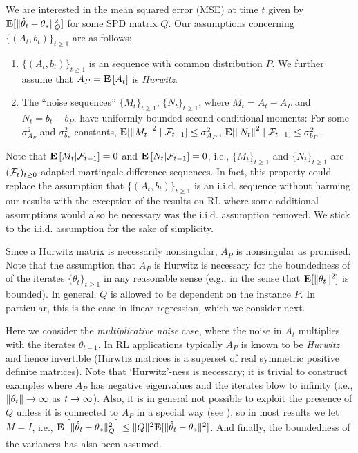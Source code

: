 We are interested in the mean squared error (MSE) at time $t$ given by $\mathbf{E}[\| \hat{\theta}_t-\theta_*\|^2_Q]$ 
for some SPD matrix $Q$. Our assumptions concerning $\{(A_t,b_t)\}_{t\ge 1}$ are as follows:
\begin{assumption}\label{assmp:lsa}
\begin{enumerate}[leftmargin=*, before = \leavevmode\vspace{-\baselineskip}]
\item \label{dist} $\{(A_t, b_t)\}_{t\ge 1}$ is an \iid sequence with common distribution $P$. 
We further assume that $A_P = \mathbf{E}\left[A_t\right]$ is \emph{Hurwitz}.  
\item \label{matvar}  
The ``noise sequences'' $\{M_t\}_{t\ge 1}$, $\{N_t\}_{t\ge 1}$,
where  $M_t= A_t-A_{P}$
 and $N_t= b_t-b_{P}$,
have uniformly bounded second conditional moments:
For some $\sigma^2_{A_P}$ and $\sigma^2_{b_P}$ constants,
$\mathbf{E}[\left\| M_t\right\|^2\mid\mathcal{F}_{t-1}]\leq \sigma^2_{A_P}$,
$\mathbf{E}[\left\| N_t\right\|^2\mid\mathcal{F}_{t-1}] \leq\sigma^2_{b_P}$.
\end{enumerate}
\end{assumption}
Note that $\mathbf{E}\left[M_t|\mathcal{F}_{t-1}\right]=0$ and $\mathbf{E}\left[N_t|\mathcal{F}_{t-1}\right]=0$, i.e., $\{M_t\}_{t\ge 1}$
and $\{N_t\}_{t\ge 1}$ are $(\mathcal{F}_t)_{t\ge 0}$-adapted martingale difference sequences. 
In fact, this property could replace
the assumption that $\{(A_t,b_t)\}_{t\ge 1}$ is an i.i.d. sequence without harming our results with the exception of the results on RL where some additional assumptions would also be necessary was the i.i.d. assumption removed. We stick to the i.i.d. assumption for the sake of simplicity.

Since a Hurwitz matrix is necessarily nonsingular, $A_P$ is nonsingular as promised.
Note that the assumption that $A_P$ is Hurwitz is necessary for the boundedness of
of the iterates $\{\theta_t\}_{t\ge 1}$ in any reasonable sense (e.g., in the sense that 
 $\mathbf{E}[\| \theta_t\|^2]$ is bounded).
 In general, $Q$ is allowed to be dependent on the instance $P$. In particular, 
 this is the case in linear regression, which we consider next.

Here we consider the \emph{multiplicative noise} case, where the noise in $A_t$ multiplies with the iterates $\theta_{t-1}$. In RL applications typically $A_P$ is known to be \emph{Hurwitz} and hence invertible (Hurwtiz matrices is a superset of real symmetric positive definite matrices). Note that `Hurwitz'-ness is necessary; it is trivial to construct examples where $A_P$ has negative eigenvalues and the iterates blow to infinity (i.e., $\left\| \theta_t\right\|\rightarrow\infty$ as $t\rightarrow\infty$). Also, it is in general not possible to exploit the presence of $Q$ unless it is connected to $A_P$ in a special way (see ), so in most results we let $M = I$, i.e., $\mathbf{E}\left[\| \hat{\theta}_t-\theta_*\|^2_Q\right]\leq \| Q\|^2\mathbf{E}[\| \hat{\theta}_t-\theta_*\|^2]$. 
And finally, the boundedness of the variances has also been assumed. 
\fi



